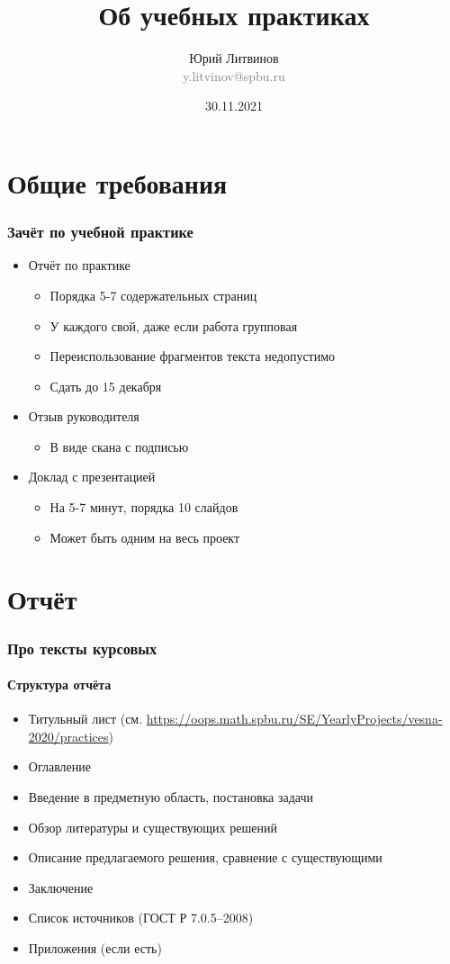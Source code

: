 \documentclass[xetex,mathserif,serif]{beamer}
\title{Об учебных практиках}
\author[Юрий Литвинов]{Юрий Литвинов\\\small{\textcolor{gray}{y.litvinov@spbu.ru}}}
\date{30.11.2021}
\begin{document}
    \frame{\titlepage}

    \section{Общие требования}

    \begin{frame}
        \frametitle{Зачёт по учебной практике}
        \begin{itemize}
            \item Отчёт по практике
            \begin{itemize}
                \item Порядка 5-7 содержательных страниц
                \item У каждого свой, даже если работа групповая
                \item Переиспользование фрагментов текста недопустимо
                \item Сдать до 15 декабря
            \end{itemize}
            \item Отзыв руководителя
            \begin{itemize}
                \item В виде скана с подписью
            \end{itemize}
            \item Доклад с презентацией
            \begin{itemize}
                \item На 5-7 минут, порядка 10 слайдов
                \item Может быть одним на весь проект
            \end{itemize}
        \end{itemize}
    \end{frame}

    \section{Отчёт}

    \begin{frame}
        \frametitle{Про тексты курсовых}
        \framesubtitle{Структура отчёта}
        \begin{itemize}
            \item Титульный лист (см. \url{https://oops.math.spbu.ru/SE/YearlyProjects/vesna-2020/practices})
            \item Оглавление
            \item Введение в предметную область, постановка задачи
            \item Обзор литературы и существующих решений
            \item Описание предлагаемого решения, сравнение с существующими
            \item Заключение
            \item Список источников (ГОСТ Р 7.0.5--2008)
            \item Приложения (если есть)
        \end{itemize}
    \end{frame}
\end{document}
